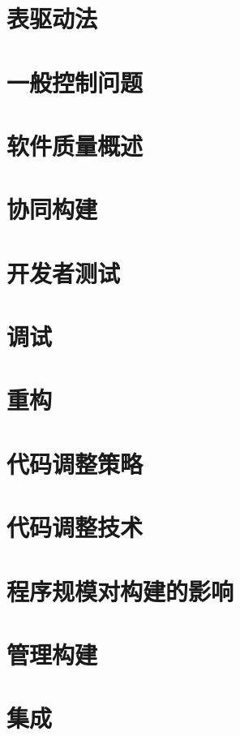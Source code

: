 \documentclass{article}
\begin{document}
\section{表驱动法}

\section{一般控制问题}

\section{软件质量概述}

\section{协同构建}

\section{开发者测试}

\section{调试}

\section{重构}

\section{代码调整策略}

\section{代码调整技术}

\section{程序规模对构建的影响}

\section{管理构建}

\section{集成}
\end{document}
